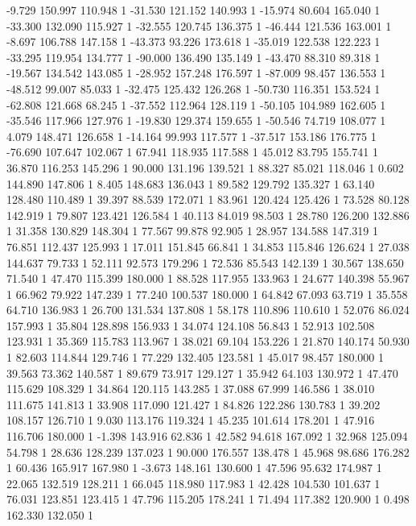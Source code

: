 	-9.729 150.997 110.948 1
	-31.530 121.152 140.993 1
	-15.974 80.604 165.040 1
	-33.300 132.090 115.927 1
	-32.555 120.745 136.375 1
	-46.444 121.536 163.001 1
	-8.697 106.788 147.158 1
	-43.373 93.226 173.618 1
	-35.019 122.538 122.223 1
	-33.295 119.954 134.777 1
	-90.000 136.490 135.149 1
	-43.470 88.310 89.318 1
	-19.567 134.542 143.085 1
	-28.952 157.248 176.597 1
	-87.009 98.457 136.553 1
	-48.512 99.007 85.033 1
	-32.475 125.432 126.268 1
	-50.730 116.351 153.524 1
	-62.808 121.668 68.245 1
	-37.552 112.964 128.119 1
	-50.105 104.989 162.605 1
	-35.546 117.966 127.976 1
	-19.830 129.374 159.655 1
	-50.546 74.719 108.077 1
	4.079 148.471 126.658 1
	-14.164 99.993 117.577 1
	-37.517 153.186 176.775 1
	-76.690 107.647 102.067 1
	67.941 118.935 117.588 1
	45.012 83.795 155.741 1
	36.870 116.253 145.296 1
	90.000 131.196 139.521 1
	88.327 85.021 118.046 1
	0.602 144.890 147.806 1
	8.405 148.683 136.043 1
	89.582 129.792 135.327 1
	63.140 128.480 110.489 1
	39.397 88.539 172.071 1
	83.961 120.424 125.426 1
	73.528 80.128 142.919 1
	79.807 123.421 126.584 1
	40.113 84.019 98.503 1
	28.780 126.200 132.886 1
	31.358 130.829 148.304 1
	77.567 99.878 92.905 1
	28.957 134.588 147.319 1
	76.851 112.437 125.993 1
	17.011 151.845 66.841 1
	34.853 115.846 126.624 1
	27.038 144.637 79.733 1
	52.111 92.573 179.296 1
	72.536 85.543 142.139 1
	30.567 138.650 71.540 1
	47.470 115.399 180.000 1
	88.528 117.955 133.963 1
	24.677 140.398 55.967 1
	66.962 79.922 147.239 1
	77.240 100.537 180.000 1
	64.842 67.093 63.719 1
	35.558 64.710 136.983 1
	26.700 131.534 137.808 1
	58.178 110.896 110.610 1
	52.076 86.024 157.993 1
	35.804 128.898 156.933 1
	34.074 124.108 56.843 1
	52.913 102.508 123.931 1
	35.369 115.783 113.967 1
	38.021 69.104 153.226 1
	21.870 140.174 50.930 1
	82.603 114.844 129.746 1
	77.229 132.405 123.581 1
	45.017 98.457 180.000 1
	39.563 73.362 140.587 1
	89.679 73.917 129.127 1
	35.942 64.103 130.972 1
	47.470 115.629 108.329 1
	34.864 120.115 143.285 1
	37.088 67.999 146.586 1
	38.010 111.675 141.813 1
	33.908 117.090 121.427 1
	84.826 122.286 130.783 1
	39.202 108.157 126.710 1
	9.030 113.176 119.324 1
	45.235 101.614 178.201 1
	47.916 116.706 180.000 1
	-1.398 143.916 62.836 1
	42.582 94.618 167.092 1
	32.968 125.094 54.798 1
	28.636 128.239 137.023 1
	90.000 176.557 138.478 1
	45.968 98.686 176.282 1
	60.436 165.917 167.980 1
	-3.673 148.161 130.600 1
	47.596 95.632 174.987 1
	22.065 132.519 128.211 1
	66.045 118.980 117.983 1
	42.428 104.530 101.637 1
	76.031 123.851 123.415 1
	47.796 115.205 178.241 1
	71.494 117.382 120.900 1
	0.498 162.330 132.050 1
